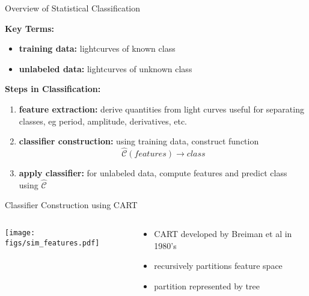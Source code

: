 \documentclass[12pt]{beamer}
\begin{document}
\begin{frame}{Overview of Statistical Classification}

\textbf{Key Terms:}
\begin{itemize}
\item \textbf{training data:} lightcurves of known class
\item \textbf{unlabeled data:} lightcurves of unknown class
\end{itemize}

\vspace{.2in}

\textbf{Steps in Classification:}
\begin{enumerate}
\item \textbf{feature extraction:} derive quantities from light curves useful for separating classes, eg period, amplitude, derivatives, etc.
\item \textbf{classifier construction:} using training data, construct function
\begin{equation*}
\widehat{\mathcal{C}}(features) \rightarrow class
\end{equation*} 
\item \textbf{apply classifier:} for unlabeled data, compute features and predict class using $\widehat{\mathcal{C}}$
\end{enumerate}
\end{frame}

\begin{frame}{Classifier Construction using CART}
\begin{columns}[T] %

\begin{column}{.5\textwidth}
\texttt{[image: figs/sim\_features.pdf]}
\end{column}
\begin{column}{.5\textwidth}
\begin{itemize}
\item CART developed by Breiman et al in 1980's %
\item recursively partitions feature space
\item partition represented by tree
\end{itemize}
\end{column}


\end{columns}
\end{frame}
\end{document}
